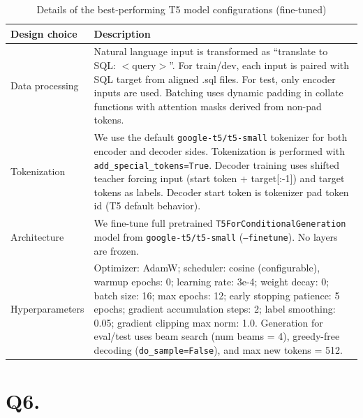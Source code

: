 \documentclass{article}
\begin{document}
\begin{table}[h!]
  \centering
  \begin{tabular}{p{3.5cm}p{10cm}}
    \toprule
    Design choice & Description \\
    \midrule
    Data processing & Natural language input is transformed as
    ``translate to SQL: $<$query$>$''. For train/dev, each input is
    paired with SQL target from aligned .sql files. For test, only
    encoder inputs are used. Batching uses dynamic padding in collate
    functions with attention masks derived from non-pad tokens. \\
    Tokenization & We use the default \texttt{google-t5/t5-small}
    tokenizer for both encoder and decoder sides. Tokenization is
    performed with \texttt{add\_special\_tokens=True}. Decoder
    training uses shifted teacher forcing input (start token +
    target[:-1]) and target tokens as labels. Decoder start token is
    tokenizer pad token id (T5 default behavior). \\
    Architecture & We fine-tune full pretrained
    \texttt{T5ForConditionalGeneration} model from
    \texttt{google-t5/t5-small} (\texttt{--finetune}). No layers are frozen. \\
    Hyperparameters & Optimizer: AdamW; scheduler: cosine
    (configurable), warmup epochs: 0; learning rate: 3e-4; weight
    decay: 0; batch size: 16; max epochs: 12; early stopping
    patience: 5 epochs; gradient accumulation steps: 2; label
    smoothing: 0.05; gradient clipping max norm: 1.0. Generation for
    eval/test uses beam search (num beams = 4), greedy-free decoding
    (\texttt{do\_sample=False}), and max new tokens = 512. \\
    \bottomrule
  \end{tabular}
  \caption{Details of the best-performing T5 model configurations (fine-tuned)}
  \label{tab:t5_results_ft}
\end{table}

\section*{Q6. }
\label{Q6}
\end{document}
